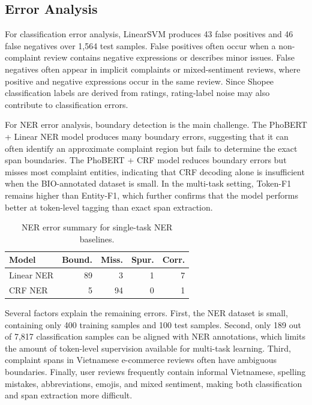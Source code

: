 \documentclass[11pt]{article}
\begin{document}
\subsection{Error Analysis}

For classification error analysis, LinearSVM produces 43 false positives and 46 false negatives over 1,564 test samples. False positives often occur when a non-complaint review contains negative expressions or describes minor issues. False negatives often appear in implicit complaints or mixed-sentiment reviews, where positive and negative expressions occur in the same review. Since Shopee classification labels are derived from ratings, rating-label noise may also contribute to classification errors.

For NER error analysis, boundary detection is the main challenge. The PhoBERT + Linear NER model produces many boundary errors, suggesting that it can often identify an approximate complaint region but fails to determine the exact span boundaries. The PhoBERT + CRF model reduces boundary errors but misses most complaint entities, indicating that CRF decoding alone is insufficient when the BIO-annotated dataset is small. In the multi-task setting, Token-F1 remains higher than Entity-F1, which further confirms that the model performs better at token-level tagging than exact span extraction.

\begin{table}[t]
\centering
\small
\setlength{\tabcolsep}{4pt}
\begin{tabular}{lrrrr}
\toprule
Model & Bound. & Miss. & Spur. & Corr. \\
\midrule
Linear NER & 89 & 3 & 1 & 7 \\
CRF NER & 5 & 94 & 0 & 1 \\
\bottomrule
\end{tabular}
\caption{NER error summary for single-task NER baselines.}
\label{tab:ner-error}
\end{table}

Several factors explain the remaining errors. First, the NER dataset is small, containing only 400 training samples and 100 test samples. Second, only 189 out of 7,817 classification samples can be aligned with NER annotations, which limits the amount of token-level supervision available for multi-task learning. Third, complaint spans in Vietnamese e-commerce reviews often have ambiguous boundaries. Finally, user reviews frequently contain informal Vietnamese, spelling mistakes, abbreviations, emojis, and mixed sentiment, making both classification and span extraction more difficult.
\end{document}
